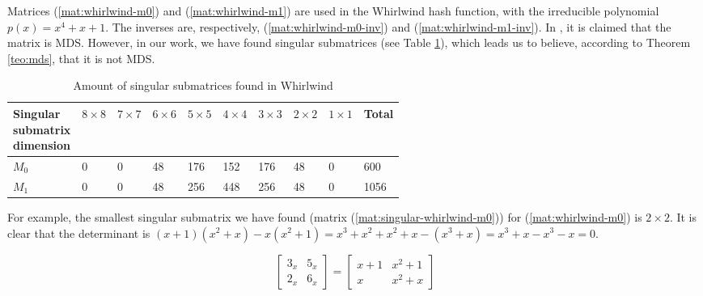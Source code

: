 
Matrices (\ref{mat:whirlwind-m0}) and (\ref{mat:whirlwind-m1}) are used in the Whirlwind hash function, with the irreducible polynomial $p(x) = x^4+x+1$. The inverses are, respectively, (\ref{mat:whirlwind-m0-inv}) and (\ref{mat:whirlwind-m1-inv}). In \cite{Whirlwind2010}, it is claimed that the matrix is MDS. However, in our work, we have found singular submatrices (see Table \ref{tbl:singular-count}), which leads us to believe, according to Theorem \ref{teo:mds}, that it is not MDS.

\begin{footnotesize}
\begin{table}[H]
\begin{tabular}{|l|l|l|l|l|l|l|l|l|l|}
\hline
\shortstack{\textbf{Singular} \\ \textbf{submatrix} \\ \textbf{dimension}} & \textbf{$8\times8$} & \textbf{$7\times7$} & \textbf{$6\times6$} & \textbf{$5\times5$} & \textbf{$4\times4$} & \textbf{$3\times3$} & \textbf{$2\times2$} & \textbf{$1\times1$} & \textbf{Total} \\ \hline
$M_0$                        & 0                   & 0                   & 48                  & 176                 & 152                 & 176                 & 48                  & 0                   & 600                            \\ \hline
$M_1$                        & 0                   & 0                   & 48                  & 256                 & 448                 & 256                 & 48                  & 0                   & 1056                           \\ \hline
\end{tabular}
\caption{Amount of singular submatrices found in Whirlwind}\label{tbl:singular-count}
\end{table}
\end{footnotesize}

For example, the smallest singular submatrix we have found (matrix (\ref{mat:singular-whirlwind-m0})) for (\ref{mat:whirlwind-m0}) is $2 \times 2$. It is clear that the determinant is $(x+1)(x^2+x) - x(x^2+1) = x^3+x^2+x^2+x - (x^3+x) = x^3+x-x^3-x = 0$.

\begin{equation}\label{mat:singular-whirlwind-m0}
\begin{bmatrix}
3_x & 5_x\\
2_x & 6_x
\end{bmatrix}
=
\begin{bmatrix}
x+1 & x^2+1\\
x & x^2+x
\end{bmatrix}
\end{equation}


